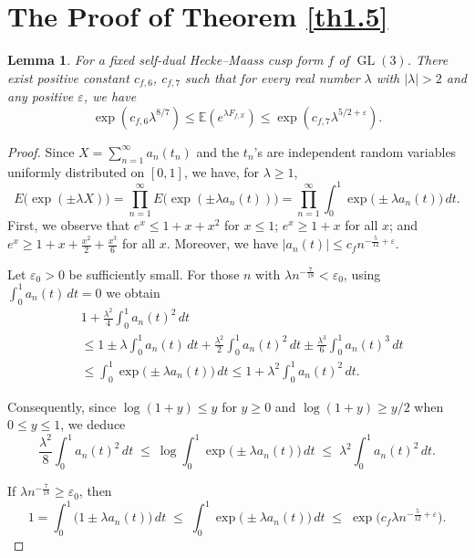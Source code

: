 \documentclass[10pt,leqno]{amsart}
\numberwithin{equation}{section}
\newtheorem{lemma}[definition]{{Lemma}}
\begin{document}
\section{The Proof of Theorem \ref{th1.5}}
\begin{lemma}\label{le7.1}
     For a fixed self-dual Hecke--Maass cusp form $f$ of $\operatorname{GL}(3)$. There  exist positive constant $c_{f,6}$, $c_{f,7}$ such that for every real  number $\lambda$ with $|\lambda|>2$ and any positive $\varepsilon$, we have 
    \[
    \exp(c_{f,6}\lambda^{8/7})\leqslant \mathbb{E}(e^{\lambda F_{f,\mathbb{X}}})\leqslant\exp(c_{f,7}\lambda^{5/2+\varepsilon}).
    \]
\end{lemma}
\begin{proof}
    Since $X = \sum_{n=1}^\infty a_n(t_n)$ and the $t_n$'s are independent random variables uniformly distributed on $[0,1]$, we have, for $\lambda \geq 1$,
    \[
    E\bigl(\exp(\pm \lambda X)\bigr)=\prod_{n=1}^\infty E\bigl(\exp(\pm \lambda a_n(t))\bigr)=\prod_{n=1}^\infty\int_0^1 \exp\bigl(\pm \lambda a_n(t)\bigr)\,dt .
    \]
    First, we observe that $e^x\leq 1+x+x^2$ for $x\leq 1$; $e^x\geq 1+x$ for all $x$; and $e^x\geq 1+x+\frac{x^2}{2}+\frac{x^3}{6}$ for all $x$. Moreover, we have $|a_n(t)|\leq c_f n^{-\frac{5}{12}+\varepsilon}$.
    
    Let $\varepsilon_0>0$ be sufficiently small.  For those $n$ with $\lambda n^{-\frac{7}{18}}<\varepsilon_0$, using $\int_0^1 a_n(t)\,dt=0$ we obtain
    \[
    \begin{aligned}
    &1+\frac{\lambda^2}{4}\int_0^1 a_n(t)^2\,dt\\
    &\leq 1\pm\lambda\int_{0}^{1}a_{n}(t)\,dt+\frac{\lambda^{2}}{2}\int_{0}^{1}a_{n}(t)^{2}\,dt\pm\frac{\lambda^{3}}{6}\int_{0}^{1}a_{n}(t)^{3}\,dt \\
    &\leq \int_{0}^{1}\exp\bigl(\pm\lambda a_{n}(t)\bigr)\,dt \leq 1+\lambda^{2}\int_{0}^{1}a_{n}(t)^{2}\,dt .
    \end{aligned}
    \]
    
    Consequently, since $\log(1+y)\leq y$ for $y\geq 0$ and $\log(1+y)\geq y/2$ when $0\leq y\leq 1$, we deduce
    \[
    \frac{\lambda^{2}}{8}\int_{0}^{1}a_{n}(t)^{2}\,dt\;\leq\
    \log\int_{0}^{1}\exp\bigl(\pm\lambda a_{n}(t)\bigr)\,dt\;\leq\;
    \lambda^{2}\int_{0}^{1}a_{n}(t)^{2}\,dt .
    \]
    
    If $\lambda n^{-\frac{7}{18}}\geq \varepsilon_0$, then
    \[
    1=\int_0^1\bigl(1\pm\lambda a_n(t)\bigr)\,dt\;\leq\;
    \int_0^1\exp\bigl(\pm\lambda a_n(t)\bigr)\,dt\;\leq\;
    \exp\bigl(c_f\lambda n^{-\frac{5}{12}+\varepsilon}\bigr).
    \]
    

\end{proof}
\end{document}
